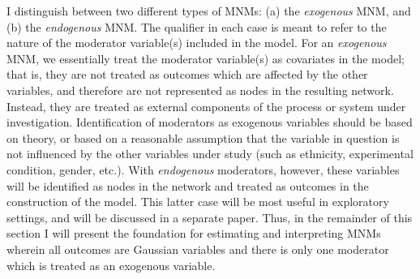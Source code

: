 I distinguish between two different types of MNMs: (a) the \textit{exogenous} MNM, and (b) the \textit{endogenous} MNM. The qualifier in each case is meant to refer to the nature of the moderator variable(s) included in the model. For an \textit{exogenous} MNM, we essentially treat the moderator variable(s) as covariates in the model; that is, they are not treated as outcomes which are affected by the other variables, and therefore are not represented as nodes in the resulting network. Instead, they are treated as external components of the process or system under investigation. Identification of moderators as exogenous variables should be based on theory, or based on a reasonable assumption that the variable in question is not influenced by the other variables under study (such as ethnicity, experimental condition, gender, etc.). With \textit{endogenous} moderators, however, these variables will be identified as nodes in the network and treated as outcomes in the construction of the model. This latter case will be most useful in exploratory settings, and will be discussed in a separate paper. Thus, in the remainder of this section I will present the foundation for estimating and interpreting MNMs wherein all outcomes are Gaussian variables and there is only one moderator which is treated as an exogenous variable.

